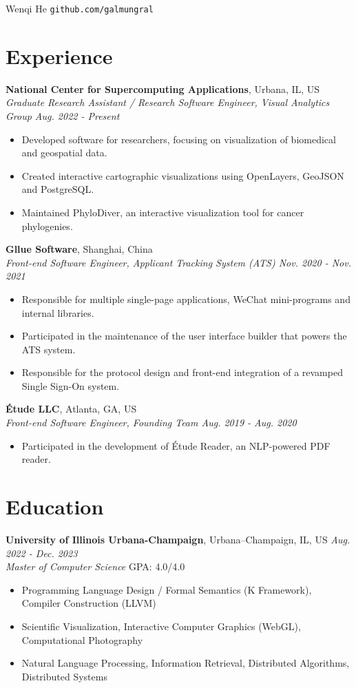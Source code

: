 \documentclass[12pt]{article}
\begin{document}
{\Huge Wenqi He} \quad \texttt{github.com/galmungral}

\section*{Experience}
\textbf{National Center for Supercomputing Applications}, Urbana, IL, US\\
\textit{\textit{Graduate Research Assistant / Research Software Engineer}, Visual Analytics Group \hfill Aug. 2022 - Present}
\begin{itemize}
\item Developed software for researchers, focusing on visualization of biomedical and geospatial data.
\item Created interactive cartographic visualizations using OpenLayers, GeoJSON and PostgreSQL.
\item Maintained PhyloDiver, an interactive visualization tool for cancer phylogenies.
\end{itemize}
\vspace{0.5em}
\textbf{Gllue Software}, Shanghai, China\\
\textit{Front-end Software Engineer, Applicant Tracking System (ATS) \hfill Nov. 2020 - Nov. 2021}
\begin{itemize}
\item Responsible for multiple single-page applications, WeChat mini-programs and internal libraries.
\item Participated in the maintenance of the user interface builder that powers the ATS system.
\item Responsible for the protocol design and front-end integration of a revamped Single Sign-On system.
\end{itemize}
\vspace{0.5em}
\textbf{Étude LLC}, Atlanta, GA, US\\
\textit{Front-end Software Engineer, Founding Team \hfill Aug. 2019 - Aug. 2020}
\begin{itemize}
\item Participated in the development of Étude Reader, an NLP-powered PDF reader.
\end{itemize}

\section*{Education}
\textbf{University of Illinois Urbana-Champaign}, Urbana–Champaign, IL, US \hfill \textit{Aug. 2022 - Dec. 2023} \\
\textit{Master of Computer Science}  \hfill GPA: 4.0/4.0 
\begin{itemize}
\item Programming Language Design / Formal Semantics (K Framework), Compiler Construction (LLVM)
\item Scientific Visualization, Interactive Computer Graphics (WebGL), Computational Photography
\item Natural Language Processing, Information Retrieval, Distributed Algorithms, Distributed Systems
\end{itemize}
\end{document}
